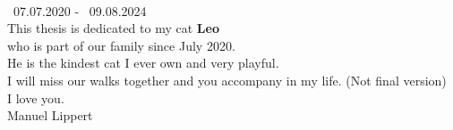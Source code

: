 \NewPage
\thispagestyle{empty}

\begin{center}
    \vspace*{3cm}
    \vspace{2cm}\\
    \gtrsymBorn~07.07.2020 - \gtrsymDied~09.08.2024 \\
    \bigskip
    This thesis is dedicated to my cat \textbf{Leo}\\ who is part of our family since July 2020.\\ He is the kindest cat I ever own and very playful.\\I will miss our walks together and you accompany in my life. (Not final version)\\ 
    \bigskip
    I love you.\\
    \bigskip
    Manuel Lippert\\
\end{center}